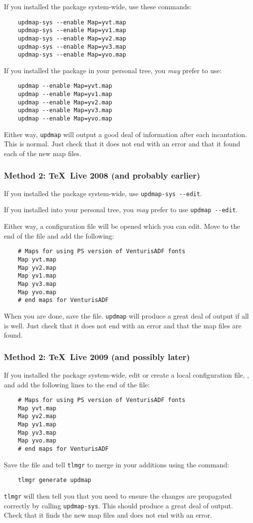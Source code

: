 \documentclass[11pt,british]{article}
\begin{document}
If you installed the package system-wide, use these commands:
\begin{verbatim}
	updmap-sys --enable Map=yvt.map
	updmap-sys --enable Map=yv1.map
	updmap-sys --enable Map=yv2.map
	updmap-sys --enable Map=yv3.map
	updmap-sys --enable Map=yvo.map
\end{verbatim}
If you installed the package in your personal tree, you \emph{may} prefer to use:
\begin{verbatim}
	updmap --enable Map=yvt.map
	updmap --enable Map=yv1.map
	updmap --enable Map=yv2.map
	updmap --enable Map=yv3.map
	updmap --enable Map=yvo.map
\end{verbatim}

Either way, \verb|updmap| will output a good deal of information after each incantation. This is normal. Just check that it does not end with an error and that it found each of the new map files.

\subsubsection{Method 2: \TeX~Live 2008 (and probably earlier)}

If you installed the package system-wide, use \verb|updmap-sys --edit|.

If you installed into your personal tree, you \emph{may} prefer to use	\verb|updmap --edit|.

Either way, a configuration file will be opened which you can edit. Move to the end of the file and add the following:
\begin{verbatim}
	# Maps for using PS version of VenturisADF fonts
	Map yvt.map
	Map yv2.map
	Map yv1.map
	Map yv3.map
	Map yvo.map
	# end maps for VenturisADF
\end{verbatim}
When you are done, save the file. \verb|updmap| will produce a great deal of output if all is well. Just check that it does not end with an error and that the map files are found.

\subsubsection{Method 2: \TeX~Live 2009 (and possibly later)}

If you installed the package system-wide, edit or create a local configuration file, , and add the following lines to the end of the file:
\begin{verbatim}
	# Maps for using PS version of VenturisADF fonts
	Map yvt.map
	Map yv2.map
	Map yv1.map
	Map yv3.map
	Map yvo.map
	# end maps for VenturisADF
\end{verbatim}
Save the file and tell \verb|tlmgr| to merge in your additions using the command:
\begin{verbatim}
	tlmgr generate updmap
\end{verbatim}
\verb|tlmgr| will then tell you that you need to ensure the changes are propagated correctly by calling \verb|updmap-sys|. This should produce a great deal of output. Check that it finds the new map files and does not end with an error.
\end{document}

